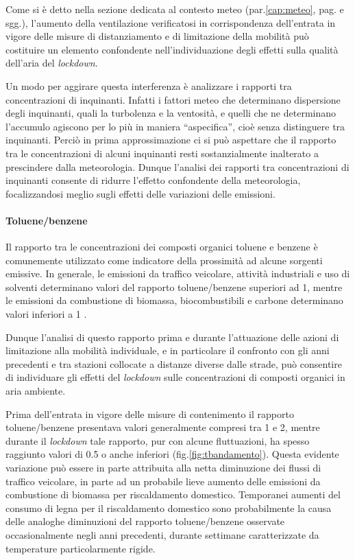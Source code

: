 Come si è detto nella sezione dedicata al contesto meteo (par.\ref{cap:meteo}, pag.\pageref{cap:meteo} e sgg.), l'aumento della ventilazione verificatosi in corrispondenza dell'entrata in vigore delle misure di distanziamento e di limitazione della mobilità può costituire un elemento confondente nell'individuazione degli effetti sulla qualità dell'aria del \textit{lockdown}. 

Un modo per aggirare questa interferenza è analizzare i rapporti tra concentrazioni di inquinanti. Infatti i fattori meteo che determinano dispersione degli inquinanti, quali la turbolenza e la ventosità, e quelli che ne determinano l'accumulo agiscono per lo più in maniera ``aspecifica'', cioè senza distinguere tra inquinanti. 
Perciò in prima approssimazione ci si può aspettare che il rapporto tra le concentrazioni di alcuni inquinanti resti sostanzialmente inalterato a prescindere dalla meteorologia.
Dunque l'analisi dei rapporti tra concentrazioni di inquinanti consente di ridurre l'effetto confondente della meteorologia, focalizzandosi meglio sugli effetti delle variazioni delle emissioni.

\FloatBarrier\paragraph{Toluene/benzene}\label{cap:tb}
Il rapporto tra le concentrazioni dei composti organici toluene e benzene è comunemente utilizzato come indicatore della prossimità ad alcune sorgenti emissive. In generale, le emissioni da traffico veicolare, attività industriali e uso di solventi determinano valori del rapporto toluene/benzene superiori ad 1, mentre le emissioni da combustione di biomassa, biocombustibili e carbone determinano valori inferiori a 1 \cite{zhang2016spatiotemporal,seco2013volatile}. 

Dunque l'analisi di questo rapporto prima e durante l'attuazione delle azioni di limitazione alla mobilità individuale, e in particolare il confronto con gli anni precedenti e tra stazioni collocate a distanze diverse dalle strade, può consentire di individuare gli effetti del \textit{lockdown} sulle concentrazioni di composti organici in aria ambiente.

Prima dell'entrata in vigore delle misure di contenimento il rapporto toluene/benzene presentava valori generalmente compresi tra 1 e 2, mentre durante il \textit{lockdown} tale rapporto, pur con alcune fluttuazioni, ha spesso raggiunto valori di 0.5 o anche inferiori (fig.\ref{fig:tbandamento}). Questa evidente variazione può essere in parte attribuita alla netta diminuzione dei flussi di traffico veicolare, in parte ad un probabile lieve aumento delle emissioni da combustione di biomassa per riscaldamento domestico. Temporanei aumenti del consumo di legna per il riscaldamento domestico sono probabilmente la causa delle analoghe diminuzioni del rapporto toluene/benzene osservate occasionalmente negli anni precedenti, durante settimane caratterizzate da temperature particolarmente rigide.

